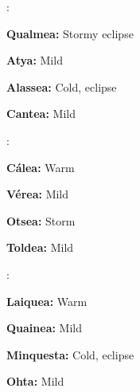 \begin{multicols}{2}

\begin{tcolorbox}
\begin{list}{\addtocounter{enc}{1} \bf Cycle }{}

\item :

\begin{list}{\addtocounter{list}{1}}{}

\item \textbf{Qualmea:}  Stormy eclipse

\item \textbf{Atya:}  Mild

\item \textbf{Alassea:}  Cold, eclipse

\item \textbf{Cantea:}  Mild
\end{list}

\item :

\begin{list}{\addtocounter{list}{1}}{}
\item \textbf{C\'{a}lea:}  Warm

\item \textbf{V\'{e}rea:}  Mild

\item \textbf{Otsea:}  Storm

\item \textbf{Toldea:}  Mild

\end{list}

\item :

\begin{list}{\addtocounter{list}{1}}{}

\item \textbf{Laiquea:}  Warm

\item \textbf{Quainea:}  Mild

\item \textbf{Minquesta:}  Cold, eclipse

\item \textbf{Ohta:}  Mild

\end{list}

\end{list}


\end{tcolorbox}
\end{multicols}
